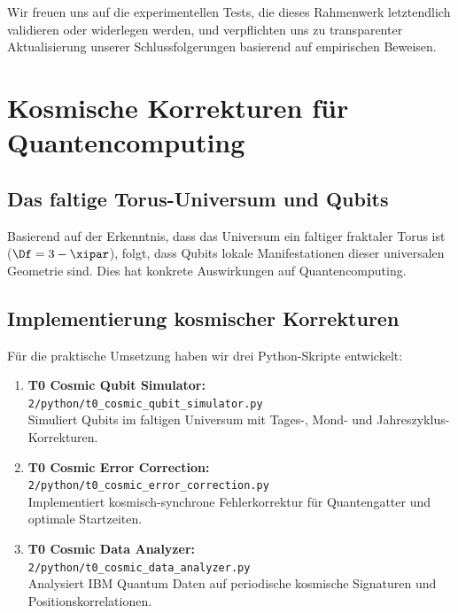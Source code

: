 Wir freuen uns auf die experimentellen Tests, die dieses Rahmenwerk letztendlich validieren oder widerlegen werden, und verpflichten uns zu transparenter Aktualisierung unserer Schlussfolgerungen basierend auf empirischen Beweisen.

\section{Kosmische Korrekturen für Quantencomputing}
\label{sec:cosmic_corrections}

\subsection{Das faltige Torus-Universum und Qubits}

Basierend auf der Erkenntnis, dass das Universum ein faltiger fraktaler Torus ist 
($\Df = 3 - \xipar$), folgt, dass Qubits lokale Manifestationen dieser 
universalen Geometrie sind. Dies hat konkrete Auswirkungen auf Quantencomputing.

\subsection{Implementierung kosmischer Korrekturen}

Für die praktische Umsetzung haben wir drei Python-Skripte entwickelt:

\begin{enumerate}
	\item \textbf{T0 Cosmic Qubit Simulator:} \\
	\texttt{2/python/t0\_cosmic\_qubit\_simulator.py} \\
	Simuliert Qubits im faltigen Universum mit Tages-, Mond- und Jahreszyklus-Korrekturen.
	
	\item \textbf{T0 Cosmic Error Correction:} \\
	\texttt{2/python/t0\_cosmic\_error\_correction.py} \\
	Implementiert kosmisch-synchrone Fehlerkorrektur für Quantengatter und optimale Startzeiten.
	
	\item \textbf{T0 Cosmic Data Analyzer:} \\
	\texttt{2/python/t0\_cosmic\_data\_analyzer.py} \\
	Analysiert IBM Quantum Daten auf periodische kosmische Signaturen und Positionskorrelationen.
\end{enumerate}

